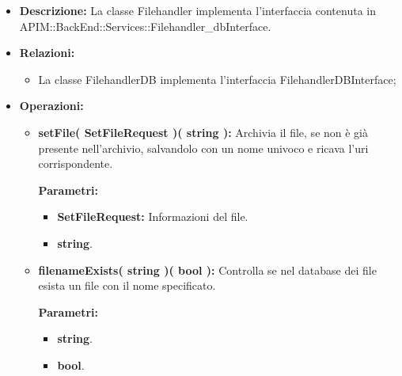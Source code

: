 \begin{itemize}
	\item \textbf{Descrizione:} La classe Filehandler implementa l'interfaccia contenuta in APIM::BackEnd::Services::Filehandler\_dbInterface.
	\item \textbf{Relazioni:}
		\begin{itemize}
			\item La classe FilehandlerDB implementa l'interfaccia FilehandlerDBInterface;
		\end{itemize}
	\item \textbf{Operazioni:}
		\begin{itemize}
		
			\item \textbf{setFile( SetFileRequest )( string ):} Archivia il file, se non è già presente nell'archivio, salvandolo con un nome univoco e ricava l'uri corrispondente.
				\begin{description}
    				\item[\textbf{Parametri:}]
				\end{description}
				\begin{itemize}
					\item \textbf{SetFileRequest:} Informazioni del file.
					\item \textbf{string}.
				\end{itemize}
				
			\item \textbf{filenameExists( string )( bool ):} Controlla se nel database dei file esista un file con il nome specificato.
				\begin{description}
    				\item[\textbf{Parametri:}]
				\end{description}
				\begin{itemize}
					\item \textbf{string}.
					\item \textbf{bool}.
				\end{itemize}
				
		\end{itemize}
\end{itemize}